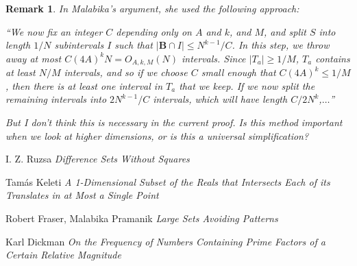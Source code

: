 \documentclass{report}
\theoremstyle{plain}
\theoremstyle{plain}
\newtheorem*{remark}{Remark}
\begin{document}
\begin{remark}
    In Malabika's argument, she used the following approach:
    
    ``We now fix an integer $C$ depending only on $A$ and $k$, and $M$, and split $S$ into length $1/N$ subintervals $I$ such that $|\mathbf{B} \cap I| \leq N^{k-1}/C$. In this step, we throw away at most $C(4A)^k N = O_{A,k,M}(N)$ intervals. Since $|T_a| \geq 1/M$, $T_a$ contains at least $N/M$ intervals, and so if we choose $C$ small enough that $C(4A)^k \leq 1/M$, then there is at least one interval in $T_a$ that we keep. If we now split the remaining intervals into $2N^{k-1}/C$ intervals, which will have length $C/2N^k$,$\dots$''

    But I don't think this is necessary in the current proof. Is this method important when we look at higher dimensions, or is this a universal simplification?
\end{remark}

\begin{thebibliography}{9}

I. Z. Ruzsa
\textit{Difference Sets Without Squares}

Tam\'{a}s Keleti
\textit{A 1-Dimensional Subset of the Reals that Intersects Each of its Translates in at Most a Single Point}

Robert Fraser, Malabika Pramanik
\textit{Large Sets Avoiding Patterns}

Karl Dickman
\textit{On the Frequency of Numbers Containing Prime Factors of a Certain Relative Magnitude}

\end{thebibliography}
\end{document}
